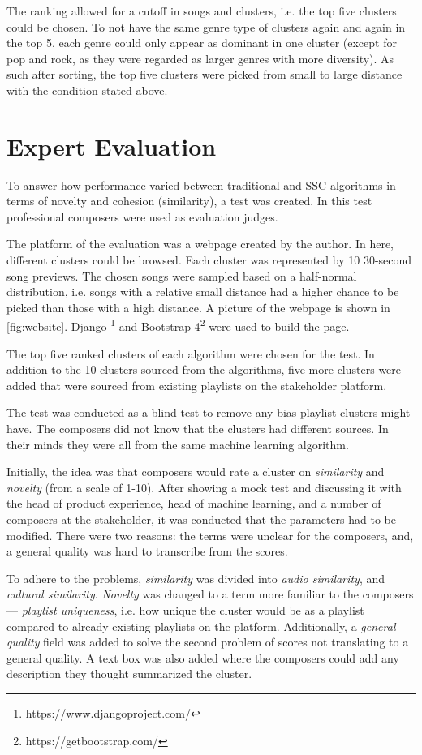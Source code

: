 \documentclass[../report.tex]{subfiles}
\begin{document}
The ranking allowed for a cutoff in songs and clusters, i.e. the top five clusters could be chosen. To not have the same genre type of clusters again and again in the top 5, each genre could only appear as dominant in one cluster (except for pop and rock, as they were regarded as larger genres with more diversity). As such after sorting, the top five clusters were picked from small to large distance with the condition stated above.

\section{Expert Evaluation}
To answer how performance varied between traditional and SSC algorithms in terms of novelty and cohesion (similarity), a test was created. In this test professional composers were used as evaluation judges.

The platform of the evaluation was a webpage created by the author. In here, different clusters could be browsed. Each cluster was represented by 10 30-second song previews. The chosen songs were sampled based on a half-normal distribution, i.e. songs with a relative small distance had a higher chance to be picked than those with a high distance. A picture of the webpage is shown in \cref{fig:website}. Django \footnote{https://www.djangoproject.com/} and Bootstrap 4\footnote{https://getbootstrap.com/} were used to build the page.

The top five ranked clusters of each algorithm were chosen for the test. In addition to the 10 clusters sourced from the algorithms, five more clusters were added that were sourced from existing playlists on the stakeholder platform.

The test was conducted as a blind test to remove any bias playlist clusters might have. The composers did not know that the clusters had different sources. In their minds they were all from the same machine learning algorithm.

Initially, the idea was that composers would rate a cluster on \textit{similarity} and \textit{novelty} (from a scale of 1-10). After showing a mock test and discussing it with the head of product experience, head of machine learning, and a number of composers at the stakeholder, it was conducted that the parameters had to be modified. There were two reasons: the terms were unclear for the composers, and, a general quality was hard to transcribe from the scores.

To adhere to the problems, \textit{similarity} was divided into \textit{audio similarity}, and \textit{cultural similarity}. \textit{Novelty} was changed to a term more familiar to the composers --- \textit{playlist uniqueness}, i.e. how unique the cluster would be as a playlist compared to already existing playlists on the platform. Additionally, a \textit{general quality} field was added to solve the second problem of scores not translating to a general quality. A text box was also added where the composers could add any description they thought summarized the cluster.
\end{document}
